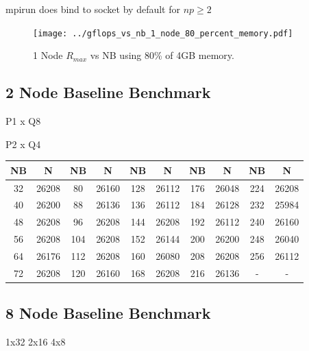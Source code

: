 \documentclass{article}
\begin{document}
mpirun does bind to socket by default for $np \geq 2$

\begin{figure}
	\centering	
	\texttt{[image: ../gflops\_vs\_nb\_1\_node\_80\_percent\_memory.pdf]}
	\caption{1 Node $R_{max}$ vs NB using 80\% of 4GB memory.}
\end{figure}



\subsection{2 Node Baseline Benchmark}

P1 x Q8

P2 x Q4

\begin{center}
	\begin{tabular}{ |c|c|c|c|c|c|c|c|c|c| } 
		\hline
		NB & N & NB & N & NB & N & NB & N & NB & N \\ 
		\hline
		32 & 26208 &   80 & 26160 & 128 & 26112 & 176 & 26048 & 224 & 26208 \\ 
		40 & 26200 &   88 & 26136 & 136 & 26112 & 184 & 26128 & 232 & 25984 \\ 
 		48 & 26208 &   96 & 26208 & 144 & 26208 & 192 & 26112 & 240 & 26160 \\
		56 & 26208 & 104 & 26208 & 152 & 26144 & 200 & 26200 & 248 & 26040 \\ 
 		64 & 26176 & 112 & 26208 & 160 & 26080 & 208 & 26208 & 256 & 26112 \\
		72 & 26208 & 120 & 26160 & 168 & 26208 & 216 & 26136 &     - &         - \\ 
 		\hline
	\end{tabular}
\end{center}




\subsection{8 Node Baseline Benchmark}

1x32
2x16
4x8

\end{document}
